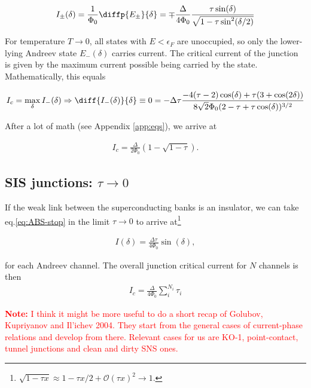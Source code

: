 \begin{eqnarray}
I_{\pm}(\delta)=\frac{1}{\Phi_0}\diffp{ E_{\pm}}{\delta}=\mp\frac{\Delta}{4\Phi_0}\frac{\tau\sin(\delta)}{\sqrt{1-\tau\sin^2(\delta/2)}}
\label{eq:CPR-full}
\end{eqnarray}

For temperature $T\rightarrow0$, all states with $E<\epsilon_F$ are unoccupied, so only the lower-lying Andreev state $E_{-}(\delta)$ carries current.
The critical current of the junction is given by the maximum current possible being carried by the state. Mathematically, this equals

\begin{eqnarray}
I_c=\max_\delta I_{-}(\delta) \Rightarrow \diff{I_{-}(\delta)}{\delta}\equiv0=-\Delta\tau\frac{-4(\tau-2)\cos(\delta)+\tau(3+\cos(2\delta))}{8\sqrt{2}\Phi_0(2-\tau+\tau\cos(\delta))^{3/2}}
\label{eq:ABS-start}
\end{eqnarray}

After a lot of math (see Appendix \ref{app:eqs}), we arrive at

\begin{eqnarray}
I_c = \frac{\Delta}{2\Phi_0}\left( 1-\sqrt{1-\tau} \right).
\label{eq:ABS-stop}
\end{eqnarray}

\subsection{SIS junctions: $\tau \rightarrow 0$}
If the weak link between the superconducting banks is an insulator, we can take eq.\ref{eq:ABS-stop} in the limit $\tau \rightarrow 0$ to arrive at\footnote{$\sqrt{1-\tau x}\approx 1-\tau x/2+\mathcal{O}(\tau x)^2\rightarrow 1$.}

\begin{eqnarray}
I(\delta)=\frac{\Delta\tau}{4\Phi_0}\sin(\delta),
\end{eqnarray}

for each Andreev channel. The overall junction critical current for $N$ channels is then 
\begin{eqnarray}
	I_c=\frac{\Delta}{4\Phi_0}\sum_{i}^{N_i}\tau_i
\end{eqnarray}

\textcolor{red}{\textbf{Note:} I think it might be more useful to do a short recap of Golubov, Kupriyanov and Il'ichev 2004. 
They start from the general cases of current-phase relations and develop from there.
Relevant cases for us are KO-1, point-contact, tunnel junctions and clean and dirty SNS ones.}


